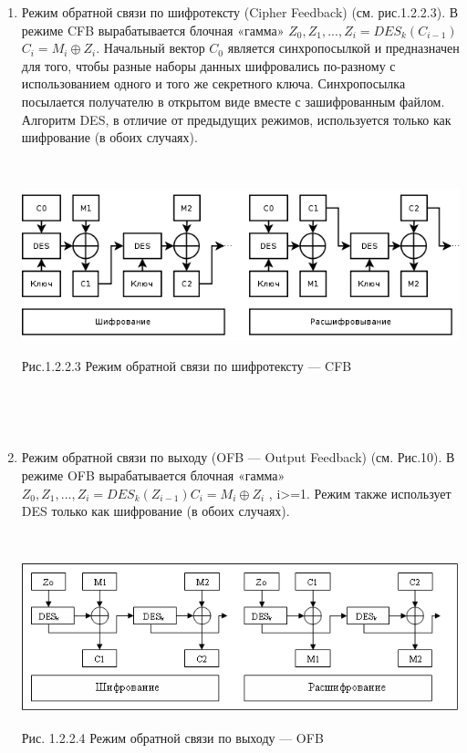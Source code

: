 \documentclass[a4paper]{report}
\begin{document}
\begin{enumerate}
~

\item Режим обратной связи по шифротексту (Cipher Feedback) (см. рис.1.2.2.3). В режиме CFB вырабатывается блочная «гамма» $Z_{0},Z_{1},...,Z_{i}=DES_{k}(C_{i-1})$ $C_{i} = M_{i}\oplus Z_{i}$. Начальный вектор $C_{0}$ является синхропосылкой и предназначен для того, чтобы разные наборы данных шифровались по-разному с использованием одного и того же секретного ключа. Синхропосылка посылается получателю в открытом виде вместе с зашифрованным файлом. Алгоритм DES, в отличие от предыдущих режимов, используется только как шифрование (в обоих случаях).

~

\includegraphics[scale=0.7]{CF}
{\centering\caption{\newline Рис.1.2.2.3 Режим обратной связи по шифротексту — CFB}\\}

~

\item Режим обратной связи по выходу (OFB — Output Feedback) (см. Рис.10). В режиме OFB вырабатывается блочная «гамма» $Z_{0},Z_{1},...,Z_{i}=DES_{k}(Z_{i-1})C_{i}=M_{i}\oplus Z_{i}$ , i>=1. Режим также использует DES только как шифрование (в обоих случаях).

~

\includegraphics[scale=1.1]{OFB}
{\centering\caption{\newline Рис. 1.2.2.4 Режим обратной связи по выходу — OFB}\\}
\end{enumerate}
\end{document}
